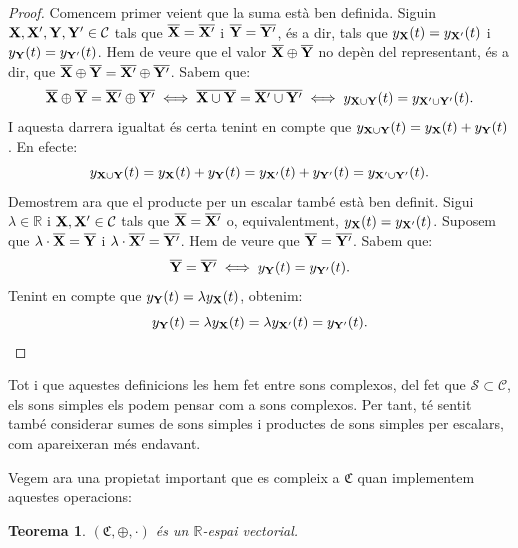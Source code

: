 \documentclass{article}
\theoremstyle{math}
\newtheorem{theorem}[definition]{Teorema}
\newcommand{\0}{\ensuremath{\vb{0}}}
\newcommand{\X}{\ensuremath{\vb{X}}}
\newcommand{\Y}{\ensuremath{\vb{Y}}}
\newcommand{\RR}{\ensuremath{\mathbb{R}}} %
\begin{document}
\begin{proof}
    Comencem primer veient que la suma està ben definida. Siguin $\X,\X',\Y,\Y'\in\mathcal{C}$ tals que $\overline{\X}=\overline{\X'}$ i $\overline{\Y}=\overline{\Y'}$, és a dir, tals que $y_{\X}(t)=y_{\X'}(t)$ i $y_{\Y}(t)=y_{\Y'}(t)$. Hem de veure que el valor $\overline{\X}\oplus\overline{\Y}$ no depèn del representant, és a dir, que $\overline{\X}\oplus\overline{\Y}=\overline{\X'}\oplus\overline{\Y'}$. Sabem que: $$\overline{\X}\oplus\overline{\Y}=\overline{\X'}\oplus\overline{\Y'}\iff\overline{\X\cup\Y}=\overline{\X'\cup\Y'}\iff y_{\X\cup\Y}(t)=y_{\X'\cup\Y'}(t).$$ I aquesta darrera igualtat és certa tenint en compte que $y_{\X\cup\Y}(t)=y_{\X}(t)+y_{\Y}(t)$. En efecte: $$y_{\X\cup\Y}(t)=y_{\X}(t)+y_{\Y}(t)=y_{\X'}(t)+y_{\Y'}(t)=y_{\X'\cup\Y'}(t).$$
    Demostrem ara que el producte per un escalar també està ben definit. Sigui $\lambda\in\RR$ i $\X,\X'\in\mathcal{C}$ tals que $\overline{\X}=\overline{\X'}$ o, equivalentment, $y_{\X}(t)=y_{\X'}(t)$. Suposem que $\lambda\cdot\overline{\X}=\overline{\Y}$ i $\lambda\cdot\overline{\X'}=\overline{\Y'}$. Hem de veure que $\overline{\Y}=\overline{\Y'}$. Sabem que: $$\overline{\Y}=\overline{\Y'}\iff y_{\Y}(t)=y_{\Y'}(t).$$
    Tenint en compte que $y_{\Y}(t)=\lambda y_{\X}(t)$, obtenim: $$y_{\Y}(t)=\lambda y_{\X}(t)=\lambda y_{\X'}(t)=y_{\Y'}(t).$$
\end{proof}
Tot i que aquestes definicions les hem fet entre sons complexos, del fet que $\mathcal{S}\subset\mathcal{C}$, els sons simples els podem pensar com a sons complexos. Per tant, té sentit també considerar sumes de sons simples i productes de sons simples per escalars, com apareixeran més endavant.\par
Vegem ara una propietat important que es compleix a $\mathfrak{C}$ quan implementem aquestes operacions:
\begin{theorem}
    $(\mathfrak{C},\oplus,\cdot)$ és un $\RR$-espai vectorial.
\end{theorem}
\end{document}
